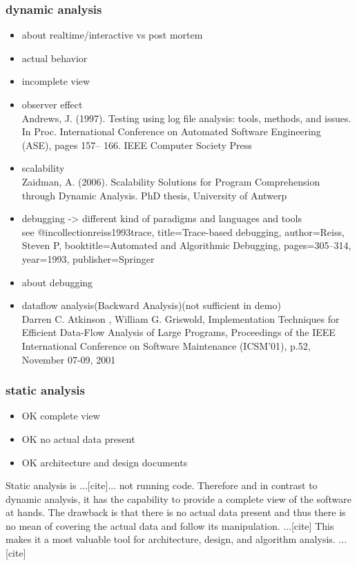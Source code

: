 \begin{itemize}
\subsubsection{dynamic analysis}

\begin{itemize}
\item about realtime/interactive vs post mortem
\item actual behavior
\item incomplete view \cite{Ball:1999:CDA:318774.318944}
\item observer effect \\
Andrews, J. (1997). Testing using log file analysis: tools, methods, and issues.
In Proc. International Conference on Automated Software Engineering (ASE), pages 157–
166. IEEE Computer Society Press
\item scalability \\
Zaidman, A. (2006). Scalability Solutions for Program Comprehension through Dynamic
Analysis. PhD thesis, University of Antwerp
\item debugging -> different kind of paradigms and languages and tools\\
see @incollection{reiss1993trace,
title={Trace-based debugging},
author={Reiss, Steven P},
booktitle={Automated and Algorithmic Debugging},
pages={305--314},
year={1993},
publisher={Springer}
}
\item about debugging
\item dataflow analysis(Backward Analysis)(not sufficient in demo) \\
	Darren C. Atkinson , William G. Griswold, Implementation Techniques for Efficient Data-Flow Analysis of Large Programs, Proceedings of the IEEE International Conference on Software Maintenance (ICSM'01), p.52, November 07-09, 2001
\end{itemize}

\subsubsection{static analysis}

\begin{itemize}
\item OK complete view
\item OK no actual data present
\item OK architecture and design documents
\end{itemize}

Static analysis is ...[cite]... not running code.
Therefore and in contrast to dynamic analysis, it has the capability to provide a complete view of the software at hands. The drawback is that there is no actual data present and thus there is no mean of covering the actual data and follow its manipulation. ...[cite]
This makes it a most valuable tool for architecture, design, and algorithm analysis. ...[cite]


\end{itemize}
